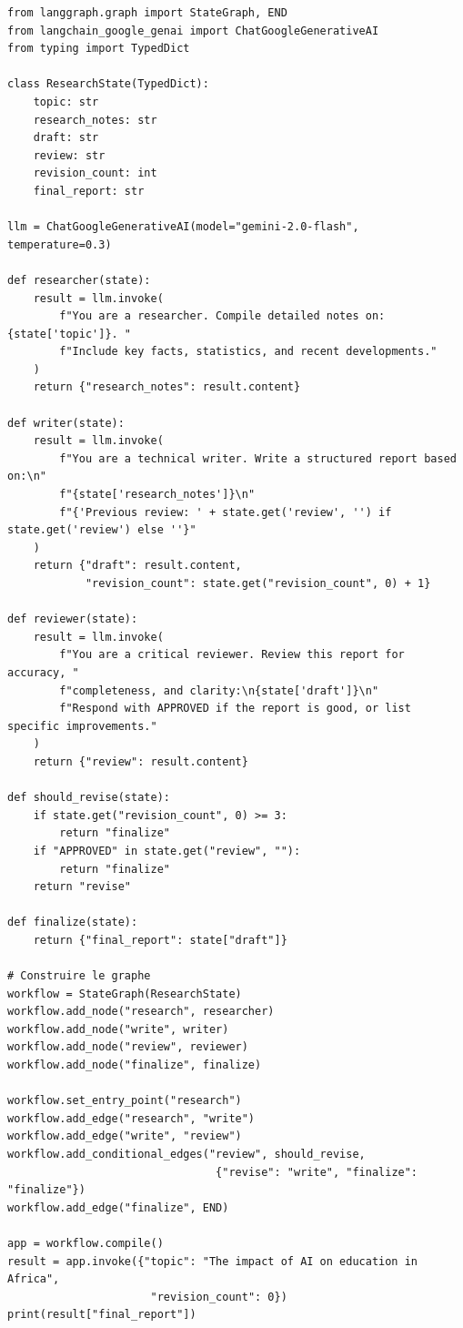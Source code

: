 \begin{verbatim}
from langgraph.graph import StateGraph, END
from langchain_google_genai import ChatGoogleGenerativeAI
from typing import TypedDict

class ResearchState(TypedDict):
    topic: str
    research_notes: str
    draft: str
    review: str
    revision_count: int
    final_report: str

llm = ChatGoogleGenerativeAI(model="gemini-2.0-flash", temperature=0.3)

def researcher(state):
    result = llm.invoke(
        f"You are a researcher. Compile detailed notes on: {state['topic']}. "
        f"Include key facts, statistics, and recent developments."
    )
    return {"research_notes": result.content}

def writer(state):
    result = llm.invoke(
        f"You are a technical writer. Write a structured report based on:\n"
        f"{state['research_notes']}\n"
        f"{'Previous review: ' + state.get('review', '') if state.get('review') else ''}"
    )
    return {"draft": result.content,
            "revision_count": state.get("revision_count", 0) + 1}

def reviewer(state):
    result = llm.invoke(
        f"You are a critical reviewer. Review this report for accuracy, "
        f"completeness, and clarity:\n{state['draft']}\n"
        f"Respond with APPROVED if the report is good, or list specific improvements."
    )
    return {"review": result.content}

def should_revise(state):
    if state.get("revision_count", 0) >= 3:
        return "finalize"
    if "APPROVED" in state.get("review", ""):
        return "finalize"
    return "revise"

def finalize(state):
    return {"final_report": state["draft"]}

# Construire le graphe
workflow = StateGraph(ResearchState)
workflow.add_node("research", researcher)
workflow.add_node("write", writer)
workflow.add_node("review", reviewer)
workflow.add_node("finalize", finalize)

workflow.set_entry_point("research")
workflow.add_edge("research", "write")
workflow.add_edge("write", "review")
workflow.add_conditional_edges("review", should_revise,
                                {"revise": "write", "finalize": "finalize"})
workflow.add_edge("finalize", END)

app = workflow.compile()
result = app.invoke({"topic": "The impact of AI on education in Africa",
                      "revision_count": 0})
print(result["final_report"])
\end{verbatim}

